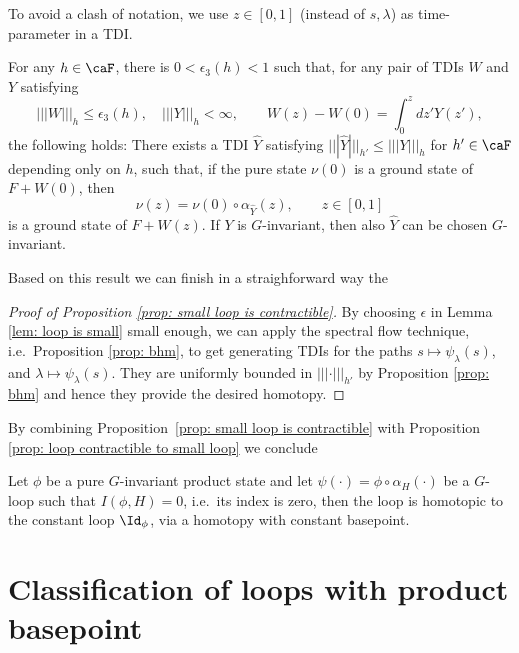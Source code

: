 To avoid a clash of notation, we use $z \in[0,1]$ (instead of $s,\lambda$) as time-parameter in a TDI.
\begin{proposition}\label{prop: bhm}
	For any $h\in\caF$, there is $0<\epsilon_3(h)< 1$ such that, for any pair of TDIs $W$ and $Y$ satisfying
	\begin{equation}\label{eq: w and e}
	|||W|||_h\leq \epsilon_3(h), \quad   |||Y|||_h <\infty, \qquad   W(z)-W(0)=\int^{z}_{0} d z' Y(z'),
	\end{equation}
	the following holds: There exists a TDI $\hat{Y}$ satisfying $|||\hat Y|||_{h'} \leq ||| Y|||_{h} $ for  $h' \in \caF$ depending only on $h$, such that, if the pure state $\nu(0)$ is a ground state of $F+W(0)$, then 
	\begin{equation}\label{eq: states determined}
	\nu(z)=\nu(0)\circ\alpha_{\hat Y}(z),\qquad z \in [0,1] 
	\end{equation}
	is a ground state of $F+W(z)$. If $Y$ is $G$-invariant, then also $\hat{Y}$ can be chosen $G$-invariant.
\end{proposition}
Based on this result we can finish in a straighforward way the
\begin{proof}[Proof of Proposition \ref{prop: small loop is contractible}]
	By choosing $\epsilon$ in Lemma \ref{lem: loop is small} small enough, we can apply the spectral flow technique, i.e.\ Proposition \ref{prop: bhm}, to get generating TDIs for the paths $s\mapsto \psi_\lambda(s)$, and  $\lambda
	\mapsto \psi_\lambda(s)$. They are uniformly bounded in $|||\cdot|||_{h'}$ by Proposition \ref{prop: bhm} and hence they provide the desired homotopy. 
\end{proof}

By combining Proposition~\ref{prop: small loop is contractible} with Proposition \ref{prop: loop contractible to small loop} we conclude 
\begin{theorem}\label{thm: contractibility products}
	Let $\phi$ be a pure $G$-invariant product state and let $\psi(\cdot)=\phi\circ\alpha_{H}(\cdot)$ be a $G$-loop such that $I(\phi,H)=0$, i.e.\ its index is zero, then the loop is homotopic to the constant loop $\Id_\phi$, via a homotopy with constant basepoint. 
\end{theorem}


\section{Classification of loops with product basepoint} \label{sec: classification for product loops}

